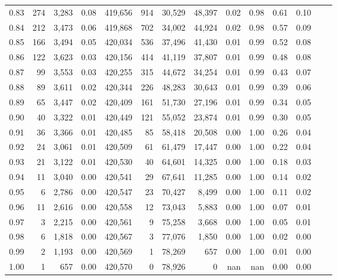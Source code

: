 \begin{tabular}{rrrrrrrrrrrrrr}
0.83 &    274 &  3,283 &     0.08 &  419,656 &      914 &  30,529 &  48,397 &  0.02 &  0.98 &  0.61 &      0.10 \\
0.84 &    212 &  3,473 &     0.06 &  419,868 &      702 &  34,002 &  44,924 &  0.02 &  0.98 &  0.57 &      0.09 \\
0.85 &    166 &  3,494 &     0.05 &  420,034 &      536 &  37,496 &  41,430 &  0.01 &  0.99 &  0.52 &      0.08 \\
0.86 &    122 &  3,623 &     0.03 &  420,156 &      414 &  41,119 &  37,807 &  0.01 &  0.99 &  0.48 &      0.08 \\
0.87 &     99 &  3,553 &     0.03 &  420,255 &      315 &  44,672 &  34,254 &  0.01 &  0.99 &  0.43 &      0.07 \\
0.88 &     89 &  3,611 &     0.02 &  420,344 &      226 &  48,283 &  30,643 &  0.01 &  0.99 &  0.39 &      0.06 \\
0.89 &     65 &  3,447 &     0.02 &  420,409 &      161 &  51,730 &  27,196 &  0.01 &  0.99 &  0.34 &      0.05 \\
0.90 &     40 &  3,322 &     0.01 &  420,449 &      121 &  55,052 &  23,874 &  0.01 &  0.99 &  0.30 &      0.05 \\
0.91 &     36 &  3,366 &     0.01 &  420,485 &       85 &  58,418 &  20,508 &  0.00 &  1.00 &  0.26 &      0.04 \\
0.92 &     24 &  3,061 &     0.01 &  420,509 &       61 &  61,479 &  17,447 &  0.00 &  1.00 &  0.22 &      0.04 \\
0.93 &     21 &  3,122 &     0.01 &  420,530 &       40 &  64,601 &  14,325 &  0.00 &  1.00 &  0.18 &      0.03 \\
0.94 &     11 &  3,040 &     0.00 &  420,541 &       29 &  67,641 &  11,285 &  0.00 &  1.00 &  0.14 &      0.02 \\
0.95 &      6 &  2,786 &     0.00 &  420,547 &       23 &  70,427 &   8,499 &  0.00 &  1.00 &  0.11 &      0.02 \\
0.96 &     11 &  2,616 &     0.00 &  420,558 &       12 &  73,043 &   5,883 &  0.00 &  1.00 &  0.07 &      0.01 \\
0.97 &      3 &  2,215 &     0.00 &  420,561 &        9 &  75,258 &   3,668 &  0.00 &  1.00 &  0.05 &      0.01 \\
0.98 &      6 &  1,818 &     0.00 &  420,567 &        3 &  77,076 &   1,850 &  0.00 &  1.00 &  0.02 &      0.00 \\
0.99 &      2 &  1,193 &     0.00 &  420,569 &        1 &  78,269 &     657 &  0.00 &  1.00 &  0.01 &      0.00 \\
1.00 &      1 &    657 &     0.00 &  420,570 &        0 &  78,926 &       0 &   nan &   nan &  0.00 &      0.00 \\
\bottomrule
\end{tabular}
